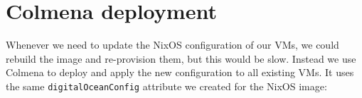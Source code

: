\begin{Shaded}
\begin{Highlighting}[]


\NormalTok{\}}

\NormalTok{\}}
\end{Highlighting}
\end{Shaded}

\hypertarget{colmena-deployment}{%
\section{Colmena deployment}\label{colmena-deployment}}

Whenever we need to update the NixOS configuration of our VMs, we could
rebuild the image and re-provision them, but this would be slow. Instead
we use Colmena to deploy and apply the new configuration to all existing
VMs. It uses the same \texttt{digitalOceanConfig} attribute we created
for the NixOS image:

